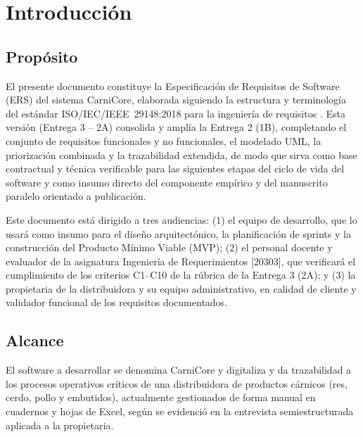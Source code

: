 \documentclass[11pt,a4paper]{article}
\begin{document}
\newpage
\tableofcontents
\newpage

\section{Introducción}
\subsection{Propósito}
El presente documento constituye la Especificación de Requisitos de Software (ERS) del sistema CarniCore, elaborada siguiendo la estructura y terminología del estándar ISO/IEC/IEEE~29148:2018 para la ingeniería de requisitos \cite{iso29148}. Esta versión (Entrega 3 -- 2A) consolida y amplía la Entrega 2 (1B), completando el conjunto de requisitos funcionales y no funcionales, el modelado UML, la priorización combinada y la trazabilidad extendida, de modo que sirva como base contractual y técnica verificable para las siguientes etapas del ciclo de vida del software y como insumo directo del componente empírico y del manuscrito paralelo orientado a publicación.

Este documento está dirigido a tres audiencias: (1) el equipo de desarrollo, que lo usará como insumo para el diseño arquitectónico, la planificación de sprints y la construcción del Producto Mínimo Viable (MVP); (2) el personal docente y evaluador de la asignatura Ingeniería de Requerimientos [20303], que verificará el cumplimiento de los criterios C1--C10 de la rúbrica de la Entrega 3 (2A); y (3) la propietaria de la distribuidora y su equipo administrativo, en calidad de cliente y validador funcional de los requisitos documentados.

\subsection{Alcance}
El software a desarrollar se denomina CarniCore y digitaliza y da trazabilidad a los procesos operativos críticos de una distribuidora de productos cárnicos (res, cerdo, pollo y embutidos), actualmente gestionados de forma manual en cuadernos y hojas de Excel, según se evidenció en la entrevista semiestructurada aplicada a la propietaria.
\end{document}
